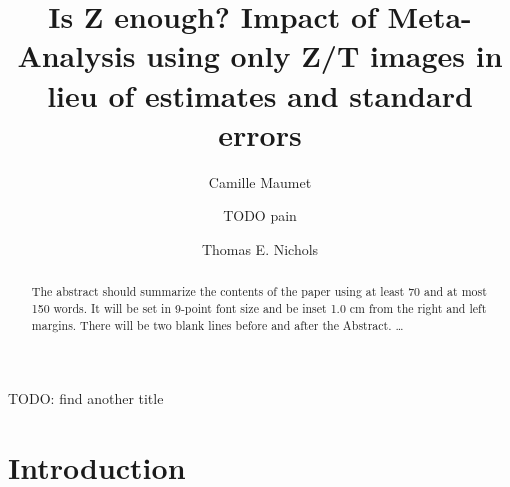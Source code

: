 \documentclass{llncs}
\begin{document}
%
\frontmatter          %
%
\pagestyle{headings}  %
%
%
\mainmatter              %
%
\title{Is Z enough? Impact of Meta-Analysis using only Z/T images in lieu of estimates and standard errors}

%
%
\author{Camille Maumet \and TODO pain
\and Thomas E. Nichols}
%
%
%

\maketitle              %

TODO: find another title

\begin{abstract}
The abstract should summarize the contents of the paper
using at least 70 and at most 150 words. It will be set in 9-point
font size and be inset 1.0 cm from the right and left margins.
There will be two blank lines before and after the Abstract. \dots
{}
\end{abstract}
%
\section{Introduction}
\end{document}
